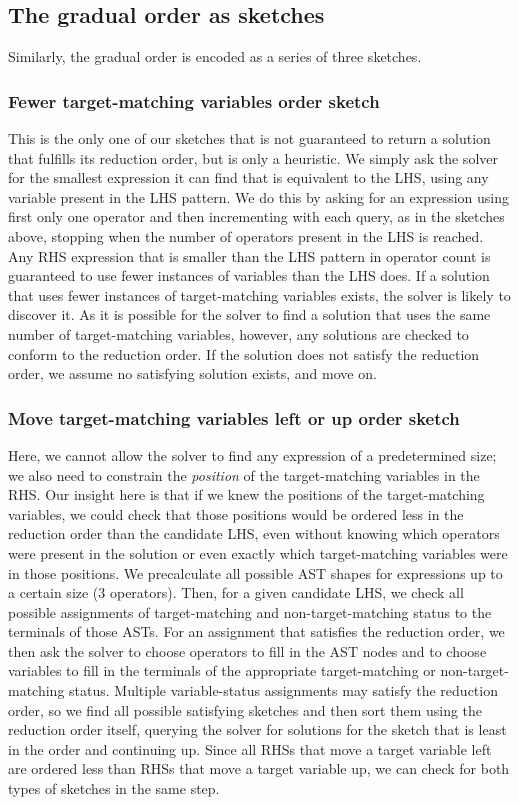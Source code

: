 \subsection{The gradual order as sketches}

Similarly, the gradual order is encoded as a series of three sketches.

\subsubsection{Fewer target-matching variables order sketch}
This is the only one of our sketches that is not guaranteed to return a solution that fulfills its reduction order, but is only a heuristic. We simply ask the solver for the smallest expression it can find that is equivalent to the LHS, using any variable present in the LHS pattern. We do this by asking for an expression using first only one operator and then incrementing with each query, as in the sketches above, stopping when the number of operators present in the LHS is reached. Any RHS expression that is smaller than the LHS pattern in operator count is guaranteed to use fewer instances of variables than the LHS does. If a solution that uses fewer instances of target-matching variables exists, the solver is likely to discover it. As it is possible for the solver to find a solution that uses the same number of target-matching variables, however, any solutions are checked to conform to the reduction order. If the solution does not satisfy the reduction order, we assume no satisfying solution exists, and move on.

\subsubsection{Move target-matching variables left or up order sketch}
Here, we cannot allow the solver to find any expression of a predetermined size; we also need to constrain the \emph{position} of the target-matching variables in the RHS. Our insight here is that if we knew the positions of the target-matching variables, we could check that those positions would be ordered less in the reduction order than the candidate LHS, even without knowing which operators were present in the solution or even exactly which target-matching variables were in those positions. We precalculate all possible AST shapes for expressions up to a certain size (3 operators). Then, for a given candidate LHS, we check all possible assignments of target-matching and non-target-matching status to the terminals of those ASTs. For an assignment that satisfies the reduction order, we then ask the solver to choose operators to fill in the AST nodes and to choose variables to fill in the terminals of the appropriate target-matching or non-target-matching status. Multiple variable-status assignments may satisfy the reduction order, so we find all possible satisfying sketches and then sort them using the reduction order itself, querying the solver for solutions for the sketch that is least in the order and continuing up. Since all RHSs that move a target variable left are ordered less than RHSs that move a target variable up, we can check for both types of sketches in the same step.


